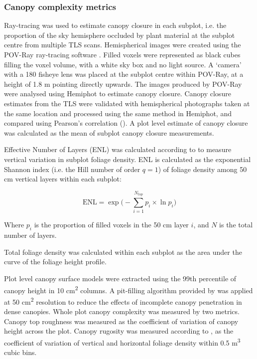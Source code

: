 \documentclass[11pt,a4paper]{article}
\begin{document}
\subsubsection{Canopy complexity metrics}

Ray-tracing was used to estimate canopy closure in each subplot, i.e. the proportion of the sky hemisphere occluded by plant material at the subplot centre from multiple TLS scans. Hemispherical images were created using the POV-Ray ray-tracing software \citep{Povray2004}. Filled voxels were represented as black cubes filling the voxel volume, with a white sky box and no light source. A `camera' with a 180\textdegree{} fisheye lens was placed at the subplot centre within POV-Ray, at a height of 1.8 m pointing directly upwards. The images produced by POV-Ray were analysed using Hemiphot \citep{HemiPhot} to estimate canopy closure. Canopy closure estimates from the TLS were validated with hemispherical photographs taken at the same location and processed using the same method in Hemiphot, and compared using Pearson's correlation (\hemiCor{}). A plot level estimate of canopy closure was calculated as the mean of subplot canopy closure measurements.

Effective Number of Layers (ENL) was calculated according to \citet{Ehbrecht2016} to measure vertical variation in subplot foliage density. ENL is calculated as the exponential Shannon index (i.e. the Hill number of order $q=1$) of foliage density among 50 cm vertical layers within each subplot:

\begin{equation}
	\text{ENL} = \exp\Big(-\sum_{i=1}^{N_{top}} p_{i} \times \ln p_{i} \Big)
\end{equation}

Where $p_{i}$ is the proportion of filled voxels in the 50 cm layer $i$, and $N$ is the total number of layers. 

Total foliage density was calculated within each subplot as the area under the curve of the foliage height profile. 

Plot level canopy surface models were extracted using the 99th percentile of canopy height in 10 cm\textsuperscript{2} columns. A pit-filling algorithm provided by \citet{Khosravipour2014} was applied at 50 cm\textsuperscript{2} resolution to reduce the effects of incomplete canopy penetration in dense canopies. Whole plot canopy complexity was measured by two metrics. Canopy top roughness was measured as the coefficient of variation of canopy height across the plot. Canopy rugosity was measured according to \citet{Hardiman2011}, as the coefficient of variation of vertical and horizontal foliage density within 0.5 m\textsuperscript{3} cubic bins. 
\end{document}
